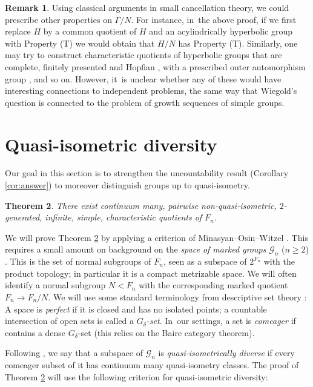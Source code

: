\documentclass[11pt]{article}
\newtheorem{theorem}{Theorem}[section]
\theoremstyle{definition}
\newtheorem{remark}[theorem]{Remark}
\newcommand{\Gn}{\mathcal{G}_n}
\begin{document}
\begin{remark}
\label{rem:T}
Using classical arguments in small cancellation theory, we could prescribe other properties on $\Gamma/N$.
For instance, in~the above proof, if we first replace $H$ by a common quotient of $H$ and an acylindrically hyperbolic group with Property (T) \cite[Cor.\,1.6]{hull} we would obtain that $H/N$ has Property (T).
Similarly, one may try to construct characteristic quotients of hyperbolic groups that are complete, finitely presented and Hopfian \cite[Th.\,10.4]{Lyndon:2001wm}, with a prescribed outer automorphism group \cite{rips:out}, and so on.
However, it~is unclear whether any of these would have interesting connections to independent problems, the same way that Wiegold's question \cite[Quest.\,6.45]{kourovka} is connected to the problem of growth sequences of simple groups.
\end{remark}

\section{Quasi-isometric diversity}
\label{s:QI}

Our goal in this section is to strengthen the uncountability result (Corollary \ref{cor:answer}) to moreover distinguish groups up to quasi-isometry.

\begin{theorem}
\label{thm:QI}
There exist continuum many, pairwise non-quasi-isometric, $2$\nobreakdash-gen\-erated, infinite, simple, characteristic quotients of $F_n$.
\end{theorem}

We will prove Theorem \ref{thm:QI} by applying a criterion of Minasyan--Osin--Witzel \cite{diversity}. This requires a small amount on background on the \emph{space of marked groups} $\Gn$ ($n \geq 2$) \cite{grigorchuk}. This is the set of normal subgroups of $F_n$, seen as a subspace of $2^{F_n}$ with the product topology; in particular it is a compact metrizable space. We will often identify a normal subgroup $N < F_n$ with the corresponding marked quotient $F_n \to F_n / N$. We will use some standard terminology from descriptive set theory \cite[I.8]{kechris}: A space is \emph{perfect} if it is closed and has no isolated points; a countable intersection of open sets is called a \emph{$G_\delta$-set}. In~our settings, a set is \emph{comeager} if contains a dense $G_\delta$-set (this relies on the Baire category theorem).

Following \cite{diversity}, we say that a subspace of $\Gn$ is \emph{quasi-isometrically diverse} if every comeager subset of it has continuum many quasi-isometry classes.
The proof of Theorem \ref{thm:QI} will use the following criterion for quasi-isometric diversity:
\end{document}
